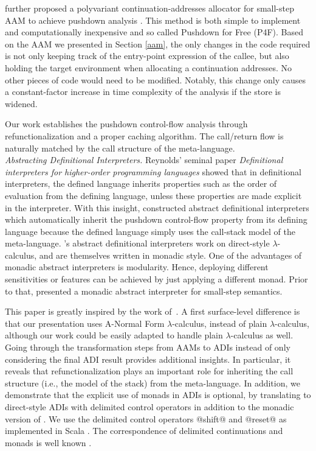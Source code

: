 \documentclass[acmsmall, review]{acmart}\settopmatter{}
\begin{document}
\citeauthor{gilray2016pushdown} further proposed a polyvariant continuation-addresses allocator
for small-step AAM to achieve pushdown analysis \cite{gilray2016pushdown}. This method is both
simple to implement and computationally inexpensive and so called Pushdown for Free (P4F).
Based on the AAM we presented in Section \ref{aam}, the only changes in the code required is not
only keeping track of the entry-point expression of the callee, but also holding the target
environment when allocating a continuation addresses. No other pieces of code would need to be
modified. Notably, this change only causes a constant-factor increase in time complexity of
the analysis if the store is widened.

Our work establishes the pushdown control-flow analysis through refunctionalization and a
proper caching algorithm. The call/return flow is naturally matched by the call structure 
of the meta-language. \\

\textit{Abstracting Definitional Interpreters.}
Reynolds' seminal paper \emph{Definitional interpreters for higher-order programming languages} 
\citet{Reynolds:72, Reynolds:HOSC98-revisited} showed that in definitional interpreters, the
defined language inherits properties such as the order of evaluation from the defining
language, unless these properties are made explicit in the 
interpreter. With this insight,
\citet{darais2017abstracting} constructed abstract definitional interpreters which
automatically inherit the pushdown control-flow property from its defining language because
the defined language simply uses the call-stack model of the meta-language.
\citeauthor{darais2017abstracting}'s abstract definitional interpreters work on direct-style
$\lambda$-calculus, and are themselves written in monadic style. One of the advantages of monadic
abstract interpreters is modularity. Hence, deploying different sensitivities
or features can be achieved by just applying a different monad. Prior to that, \citet{Sergey:2013:MAI:2491956.2491979}
presented a monadic abstract interpreter for small-step semantics.

This paper is greatly inspired by the work of~\citet{darais2017abstracting}.
A first surface-level difference is that our presentation uses A-Normal Form $\lambda$-calculus, instead of plain 
$\lambda$-calculus, although our work could be easily adapted to handle plain $\lambda$-calculus as well. 
Going through the transformation steps from AAMs to ADIs instead of only considering the final ADI result provides additional insights. In particular, it reveals that 
refunctionalization plays an important role for inheriting the call structure (i.e., the model of the stack) from the meta-language. 
In addition, we demonstrate that the explicit use of monads in ADIs is optional, by translating to direct-style ADIs with delimited control operators in addition to the monadic version of \citet{darais2017abstracting}. 
We use the delimited control operators @shift@ and @reset@ \cite{Danvy:1990:AC:91556.91622} as implemented in Scala 
\cite{rompf2009implementing}. The correspondence of delimited continuations and monads is well known
\cite{Danvy:1990:AC:91556.91622, wadler1992essence, danvy1992representing, moggi1991notions, filinski1994representing}.
\end{document}
